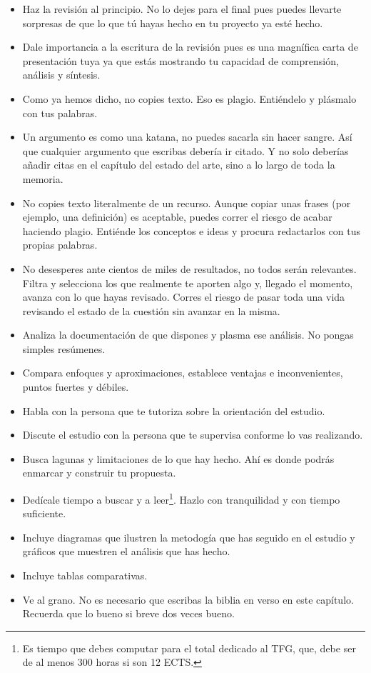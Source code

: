 \begin{itemize}
    \item Haz la revisión al principio. No lo dejes para el final pues puedes llevarte sorpresas de que lo que tú hayas hecho en tu proyecto ya esté hecho.
    \item Dale importancia a la escritura de la revisión pues es una magnífica carta de presentación tuya ya que estás mostrando tu capacidad de comprensión, análisis y síntesis.
    \item Como ya hemos dicho, no copies texto. Eso es plagio. Entiéndelo y plásmalo con tus palabras.
    \item Un argumento es como una katana, no puedes sacarla sin hacer sangre. Así que cualquier argumento que escribas debería ir citado. Y no solo deberías añadir citas en el capítulo del estado del arte, sino a lo largo de toda la memoria.
    \item No copies texto literalmente de un recurso. Aunque copiar unas frases (por ejemplo, una definición) es aceptable, puedes correr el riesgo de acabar haciendo plagio.  Entiénde los conceptos e ideas y procura redactarlos con tus propias palabras.
    \item No desesperes ante cientos de  miles de resultados, no todos serán relevantes. Filtra y selecciona los que realmente te aporten algo y, llegado el momento, avanza con lo que hayas revisado. Corres el riesgo de pasar toda una vida revisando el estado de la cuestión sin avanzar en la misma.   
    \item Analiza la documentación de que dispones y plasma ese análisis. No pongas simples resúmenes.
    \item Compara enfoques y aproximaciones, establece ventajas e inconvenientes, puntos fuertes y débiles.
    \item Habla con la persona que te tutoriza sobre la orientación del estudio. 
    \item Discute el estudio con la persona que te supervisa conforme lo vas realizando.
    \item Busca lagunas y limitaciones de lo que hay hecho. Ahí es donde podrás enmarcar y construir tu propuesta.
    \item Dedícale tiempo a buscar y a leer\footnote{Es tiempo que debes computar para el total dedicado al TFG, que, debe ser de al menos 300 horas si son 12 ECTS.}. Hazlo con tranquilidad y con tiempo suficiente.  
    \item Incluye diagramas que ilustren la metodogía que has seguido en el estudio y gráficos que muestren el análisis que has hecho.
    \item Incluye tablas comparativas.
    \item Ve al grano. No es necesario que escribas la biblia en verso en este capítulo. Recuerda que lo bueno si breve dos veces bueno.
\end{itemize}

